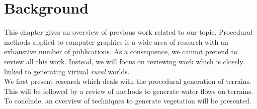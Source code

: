 
\chapter{Background}

This chapter gives an overview of previous work related to our topic. Procedural methods applied to computer graphics is a wide area of research with an exhaustive number of publications. As a consequence, we cannot pretend to review all this work. Instead, we will focus on reviewing work which is closely linked to generating virtual \textit{rural} worlds. \\

We first present research which deals with the procedural generation of terrains. This will be followed by a review of methods to generate water flows on terrains. To conclude, an overview of techniques to generate vegetation will be presented.